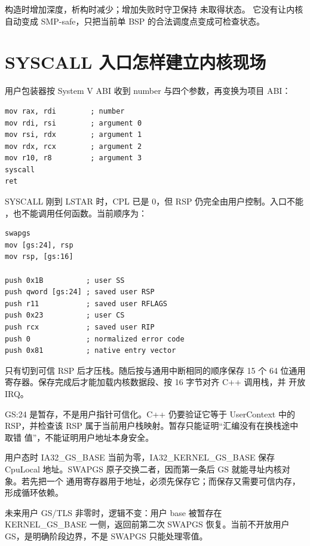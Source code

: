  构造时增加深度，析构时减少；增加失败时守卫保持
未取得状态。
它没有让内核自动变成 SMP-safe，只把当前单 BSP 的合法调度点变成可检查状态。

\section{SYSCALL 入口怎样建立内核现场}
用户包装器按 System V ABI 收到 number 与四个参数，再变换为项目 ABI：

\begin{lstlisting}[language={[x86masm]Assembler},caption={用户侧最小原生包装}]
mov rax, rdi        ; number
mov rdi, rsi        ; argument 0
mov rsi, rdx        ; argument 1
mov rdx, rcx        ; argument 2
mov r10, r8         ; argument 3
syscall
ret
\end{lstlisting}

SYSCALL 刚到 LSTAR 时，CPL 已是 0，但 RSP 仍完全由用户控制。入口不能
，也不能调用任何函数。当前顺序为：

\begin{lstlisting}[language={[x86masm]Assembler},caption={可信换栈的关键前缀}]
swapgs
mov [gs:24], rsp
mov rsp, [gs:16]

push 0x1B          ; user SS
push qword [gs:24] ; saved user RSP
push r11           ; saved user RFLAGS
push 0x23          ; user CS
push rcx           ; saved user RIP
push 0             ; normalized error code
push 0x81          ; native entry vector
\end{lstlisting}

只有切到可信 RSP 后才压栈。随后按与通用中断相同的顺序保存 15 个 64 位通用
寄存器。保存完成后才能加载内核数据段、按 16 字节对齐 C++ 调用栈，并
 开放 IRQ。

\begin{contractbox}
GS:24 是暂存，不是用户指针可信化。C++ 仍要验证它等于 UserContext 中的
RSP，并检查该 RSP 属于当前用户栈映射。暂存只能证明“汇编没有在换栈途中取错
值”，不能证明用户地址本身安全。
\end{contractbox}

用户态时 IA32\_GS\_BASE 当前为零，IA32\_KERNEL\_GS\_BASE 保存 CpuLocal
地址。SWAPGS 原子交换二者，因而第一条后 GS 就能寻址内核对象。若先把一个
通用寄存器用于地址，必须先保存它；而保存又需要可信内存，形成循环依赖。

未来用户 GS/TLS 非零时，逻辑不变：用户 base 被暂存在 KERNEL\_GS\_BASE
一侧，返回前第二次 SWAPGS 恢复。当前不开放用户 GS，是明确阶段边界，不是
SWAPGS 只能处理零值。

